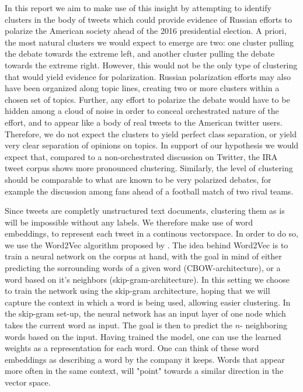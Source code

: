 \documentclass[12pt, authoryear]{elsarticle}
\begin{document}
In this report we aim to make use of this insight by attempting to identify clusters in the body of tweets which could provide evidence of Russian efforts to polarize the American society ahead of the 2016 presidential election. A priori, the most natural clusters we would expect to emerge are two: one cluster pulling the debate towards the extreme left, and another cluster pulling the debate towards the extreme right. However, this would not be the only type of clustering that would yield evidence for polarization. Russian polarization efforts may also have been organized along topic lines, creating two or more clusters within a chosen set of topics. Further, any effort to polarize the debate would have to be hidden among a cloud of noise in order to conceal orchestrated nature of the effort, and to appear like a body of real tweets to the American twitter users. Therefore, we do not expect the clusters to yield perfect class separation, or yield very clear separation of opinions on topics. In support of our hypothesis we would expect that, compared to a non-orchestrated discussion on Twitter, the IRA tweet corpus shows more pronounced clustering. Similarly, the level of clustering should be comparable to what are known to be very polarized debates, for example the discussion among fans ahead of a football match of two rival teams.

Since tweets are completly unstructured text documents, clustering them as is will be impossible without any labels. We therefore make use of word embeddings, to represent each tweet in a continous vectorspace. In order to do so, we use the Word2Vec algorithm proposed by \cite{mikolov2013efficient}. The idea behind Word2Vec is to train a neural network on the corpus at hand, with the goal in mind of either predicting the sorrounding words of a given word (CBOW-architecture), or a word based on it's neighbors (skip-gram-architecture). In this setting we choose to train the network using the skip-gram architecture, hoping that we will capture the context in which a word is being used, allowing easier clustering. In the skip-gram set-up, the neural network has an input layer of one node which takes the current word as input. The goal is then to predict the $n$- neighboring words based on the input. Having trained the model, one can use the learned weights as a representation for each word. One can think of these word embeddings as describing a word by the company it keeps. Words that appear more often in the same context, will "point" towards a similar direction in the vector space. 
\end{document}
